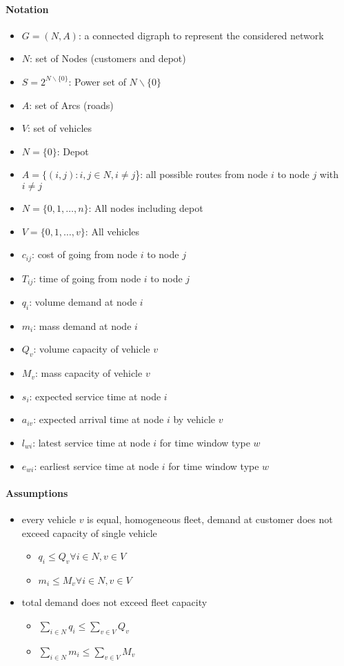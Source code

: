 \documentclass[a4paper,10pt,twoside]{report}
\begin{document}
\paragraph*{Notation}
\begin{itemize}
\item $G = (N,A)$: a connected digraph to represent the considered network
\item $N$: set of Nodes (customers and depot)
\item $S = 2^{N\backslash\{0\}}$: Power set of $N\backslash\{0\}$
\item $A$: set of Arcs (roads)
\item $V$: set of vehicles
\item $N = \{0\}$: Depot
\item $A = \{(i,j) : i,j \in N, i \neq j$\}: all possible routes from node $i$ to node $j$ with $i \neq j$ 
\item $N = \{0,1,\dots,n\}$: All nodes including depot
\item $V = \{0,1,\dots,v\}$: All vehicles
\item $c_{ij}$: cost of going from node $i$ to node $j$
\item $T_{ij}$:  time of going from node $i$ to node $j$
\item $q_{i}$: volume demand at node $i$
\item $m_{i}$: mass demand at node $i$
\item $Q_v$: volume capacity of vehicle $v$
\item $M_v$: mass capacity of vehicle $v$
\item $s_{i}$: expected service time at node $i$
\item $a_{iv}$: expected arrival time at node $i$ by vehicle $v$
\item $l_{wi}$: latest service time at node $i$ for time window type $w$
\item $e_{wi}$: earliest service time at node $i$ for time window type $w$
\end{itemize}

\paragraph{Assumptions}
\begin{itemize}
\item every vehicle $v$ is equal, homogeneous fleet, demand at customer does not exceed capacity of single vehicle
\begin{itemize}
\item[] $q_i \leq Q_v \forall i \in N, v \in V$
\item[] $m_i \leq M_v \forall i \in N, v \in V$
\end{itemize}
\item total demand does not exceed fleet capacity
\begin{itemize}
\item[] $\displaystyle\sum_{i \in N} q_i \leq \displaystyle\sum_{v \in V} Q_v $ 
\item[] $\displaystyle\sum_{i \in N} m_i \leq \displaystyle\sum_{v \in V} M_v $ 
\end{itemize}
\end{itemize}
\end{document}
